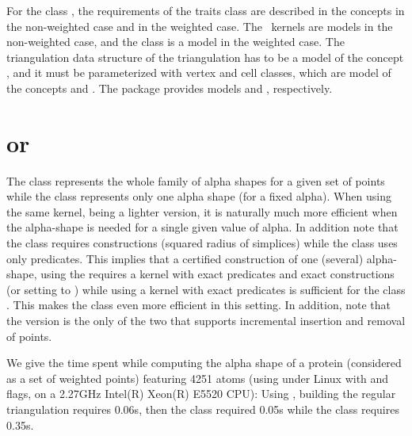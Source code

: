 For the class , the requirements of
the traits class are described in the concepts 
in the non-weighted case and  in the weighted case.
The \cgal\ kernels are models in the non-weighted case, and 
the class  is a model
in the weighted case.
The triangulation data structure of the triangulation
has to be a model of the concept ,
and it must be parameterized with vertex and cell classes, which are model of the concepts
 and .
The package provides models  
and , respectively.



\section{\texorpdfstring{ or }{Alpha\textunderscore{}shape\textunderscore{}3 or Fixed\textunderscore{}alpha\textunderscore{}shape\textunderscore{}3}}

The class  represents the whole family
of alpha shapes for a given set of points while the class 
represents only one alpha shape (for a fixed alpha). When using the same kernel,
 being a lighter version, it is naturally much more efficient 
when the alpha-shape is needed for a single given value of alpha.
In addition note that the class 
requires constructions (squared radius of simplices) while the 
class  uses only predicates.
This implies that a certified construction of one (several)
alpha-shape, using the  requires a kernel
with exact predicates and exact constructions (or setting  to )
while using a kernel with exact predicates is sufficient for the class .
This makes the class  even more efficient in this setting.
In addition, note that the  version is the only of the
two that supports incremental insertion and removal of points.

We give the time spent while computing the alpha shape of a protein (considered
as a set of weighted points) featuring 4251 atoms (using  under Linux with 
and  flags, on a 2.27GHz Intel(R) Xeon(R) E5520 CPU): 
Using , building
the regular triangulation requires 0.06s, then the class 
required 0.05s while the class  requires 0.35s.





